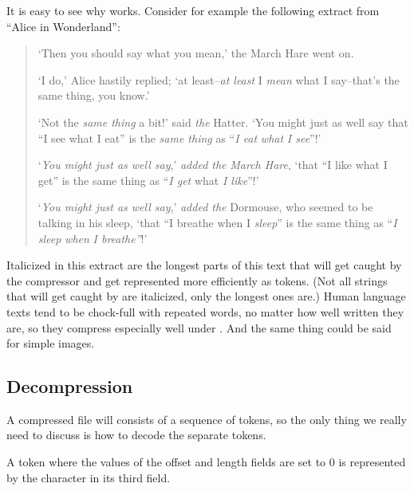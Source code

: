   It is easy to see why \lzone works. Consider for example the
  following extract from ``Alice in Wonderland'':

\begin{quote}
  `Then you should say what you mean,' the March Hare went on.

  `I do,' Alice hastily replied; `at least--\textit{at least} I
  \textit{mean} what I say--that's the same thing, you know.'

  `Not the \textit{same thing} a bit!' said \textit{the} Hatter.
  `You might just as well say that ``I see what I eat'' is the
  \textit{same thing} as ``\textit{I eat} \textit{what}
  \textit{I see}''!'

  `\textit{You might just as well say},' \textit{added the}
  \textit{March Hare}, `that ``I like what I get'' is the same
  thing as ``\textit{I get} what \textit{I like}''!'

  `\textit{You might just as well say},' \textit{added the}
  Dormouse, who seemed to be talking in his sleep, `that ``I breathe
  when I \textit{sleep}'' is the same thing as ``\textit{I
    sleep} \textit{when} \textit{I breathe''}!'

\end{quote}

Italicized in this extract are the longest parts of this text that
will get caught by the \lzone compressor and get represented more
efficiently as tokens. (Not all strings that will get caught by \lzone
are italicized, only the longest ones are.) Human language texts tend
to be chock-full with repeated words, no matter how well written they
are, so they compress especially well under \lzone. And the same thing
could be said for simple images.

\subsection{Decompression}

A \lzone compressed file will consists of a sequence of \lzone tokens, so
the only thing we really need to discuss is how to decode the separate
tokens.

A token where the values of the offset and length fields are set to
$0$ is represented by the character in its third field.

